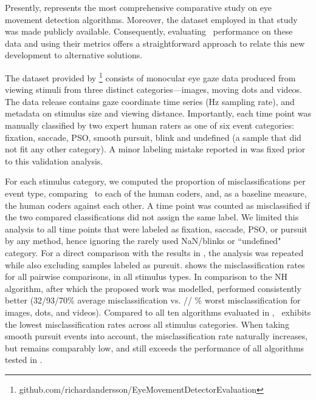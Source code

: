 Presently, \cite{Andersson2017} represents the most comprehensive comparative
study on eye movement detection algorithms. Moreover, the dataset employed
in that study was made publicly available. Consequently, evaluating \remodnav\
performance on these data and using their metrics offers a straightforward
approach to relate this new development to alternative solutions.

The dataset provided by
\cite{Andersson2017}\footnote{github.com/richardandersson/EyeMovementDetector\linebreak[0]Evaluation}
consists of monocular eye gaze data produced from viewing stimuli from three
distinct categories---images, moving dots and videos. The data release contains
gaze coordinate time series (\unit[500]{Hz} sampling rate), and metadata on
stimulus size and viewing distance.  Importantly, each time point was manually
classified by two expert human raters as one of six event categories: fixation,
saccade, PSO, smooth pursuit, blink and undefined (a sample that did not fit
any other category). A minor labeling mistake reported in \cite{Zemblys2018}
was fixed prior to this validation analysis.

For each stimulus category, we computed the proportion of misclassifications
per event type, comparing \remodnav\ to each of the human coders, and, as a
baseline measure, the human coders against each other.
%
A time point was counted as misclassified if the two compared classifications
did not assign the same label. We limited this analysis to all time points that
were labeled as fixation, saccade, PSO, or pursuit by any method, hence
ignoring the rarely used NaN/blinks or ``undefined" category. For a direct
comparison with the results in \cite{Andersson2017}, the analysis was repeated
while also excluding samples labeled as pursuit. \tab{mclf} shows the
misclassification rates for all pairwise comparisons, in all stimulus types.
In comparison to the NH algorithm, after which the proposed work was modelled,
\remodnav performed consistently better (32/93/70\% average misclassification
vs. \imgMNALMclfWOP/\dotsRAALMclfWOP/ \videoRAALMclfWOP\% worst
misclassification for images, dots, and videos).  Compared to all ten
algorithms evaluated in \citet{Andersson2017}, \remodnav\ exhibits the lowest
misclassification rates across all stimulus categories.
%
When taking smooth pursuit events into account, the misclassification rate
naturally increases, but remains comparably low, and still exceeds the
performance of all algorithms tested in \citet{Andersson2017}.

